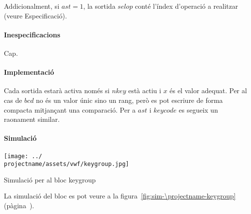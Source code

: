 Addicionalment, si $ast = 1$, la sortida $selop$ conté l'índex d'operació a realitzar (veure Especificació).

\paragraph{Inespecificacions}

Cap.

\paragraph{Implementació}




Cada sortida estarà activa només si $nkey$ està actiu i $x$ és el valor adequat.
Per al cas de $bcd$ no és un valor únic sino un rang, però es pot escriure de
forma compacta mitjançant una comparació. Per a $ast$ i $keycode$ es segueix un
raonament similar.

\paragraph{Simulació}

\begin{contendfig}
  \begin{center}
    \texttt{[image: ../\\projectname/assets/vwf/keygroup.jpg]}
  \end{center}
  \caption{\label{fig:sim-\projectname-keygroup} Simulació per al bloc \textsf{keygroup}}
\end{contendfig}

La simulació del bloc es pot veure a la figura~\ref{fig:sim-\projectname-keygroup} (pàgina~\pageref{fig:sim-\projectname-keygroup}).


\vspace{1cm}
